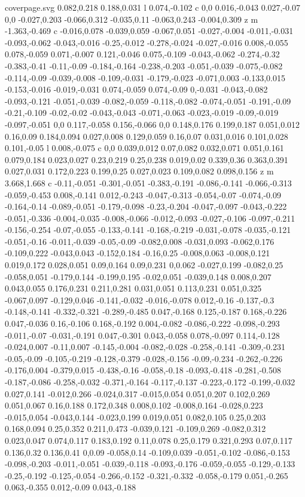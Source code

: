 \begin{filecontents}[noheader]{coverpage.svg}
0.082,0.218 0.188,0.031 l 0.074,-0.102 c 0,0 0.016,-0.043 0.027,-0.07 0,0 -0.027,0.203 -0.066,0.312 -0.035,0.11 -0.063,0.243 -0.004,0.309 z m -1.363,-0.469 c -0.016,0.078 -0.039,0.059 -0.067,0.051 -0.027,-0.004 -0.011,-0.031 -0.093,-0.062 -0.043,-0.016 -0.25,-0.012 -0.278,-0.024 -0.027,-0.016 0.008,-0.055 0.078,-0.059 0.071,-0.007 0.121,-0.046 0.075,-0.109 -0.043,-0.062 -0.274,-0.32 -0.383,-0.41 -0.11,-0.09 -0.184,-0.164 -0.238,-0.203 -0.051,-0.039 -0.075,-0.082 -0.114,-0.09 -0.039,-0.008 -0.109,-0.031 -0.179,-0.023 -0.071,0.003 -0.133,0.015 -0.153,-0.016 -0.019,-0.031 0.074,-0.059 0.074,-0.09 0,-0.031 -0.043,-0.082 -0.093,-0.121 -0.051,-0.039 -0.082,-0.059 -0.118,-0.082 -0.074,-0.051 -0.191,-0.09 -0.21,-0.109 -0.02,-0.02 -0.043,-0.043 -0.071,-0.063 -0.023,-0.019 -0.09,-0.019 -0.097,-0.051 0,0 0.117,-0.058 0.156,-0.066 0,0 0.148,0.176 0.199,0.187 0.051,0.012 0.16,0.09 0.184,0.094 0.027,0.008 0.129,0.059 0.16,0.07 0.031,0.016 0.101,0.028 0.101,-0.05 l 0.008,-0.075 c 0,0 0.039,0.012 0.07,0.082 0.032,0.071 0.051,0.161 0.079,0.184 0.023,0.027 0.23,0.219 0.25,0.238 0.019,0.02 0.339,0.36 0.363,0.391 0.027,0.031 0.172,0.223 0.199,0.25 0.027,0.023 0.109,0.082 0.098,0.156 z m 3.668,1.668 c -0.11,-0.051 -0.301,-0.051 -0.383,-0.191 -0.086,-0.141 -0.066,-0.313 -0.059,-0.453 0.008,-0.141 0.012,-0.243 -0.047,-0.313 -0.054,-0.07 -0.074,-0.09 -0.164,-0.14 -0.089,-0.051 -0.179,-0.098 -0.23,-0.204 -0.047,-0.097 -0.043,-0.222 -0.051,-0.336 -0.004,-0.035 -0.008,-0.066 -0.012,-0.093 -0.027,-0.106 -0.097,-0.211 -0.156,-0.254 -0.07,-0.055 -0.133,-0.141 -0.168,-0.219 -0.031,-0.078 -0.035,-0.121 -0.051,-0.16 -0.011,-0.039 -0.05,-0.09 -0.082,0.008 -0.031,0.093 -0.062,0.176 -0.109,0.222 -0.043,0.043 -0.152,0.184 -0.16,0.25 -0.008,0.063 -0.008,0.121 0.019,0.172 0.028,0.051 0.09,0.164 0.09,0.231 0,0.062 -0.027,0.199 -0.082,0.25 -0.058,0.051 -0.179,0.144 -0.199,0.195 -0.02,0.051 -0.039,0.148 0.008,0.207 0.043,0.055 0.176,0.231 0.211,0.281 0.031,0.051 0.113,0.231 0.051,0.325 -0.067,0.097 -0.129,0.046 -0.141,-0.032 -0.016,-0.078 0.012,-0.16 -0.137,-0.3 -0.148,-0.141 -0.332,-0.321 -0.289,-0.485 0.047,-0.168 0.125,-0.187 0.168,-0.226 0.047,-0.036 0.16,-0.106 0.168,-0.192 0.004,-0.082 -0.086,-0.222 -0.098,-0.293 -0.011,-0.07 -0.031,-0.191 0.047,-0.301 0.043,-0.058 0.078,-0.097 0.114,-0.128 -0.024,0.007 -0.11,0.007 -0.145,-0.004 -0.082,-0.028 -0.258,-0.141 -0.309,-0.231 -0.05,-0.09 -0.105,-0.219 -0.128,-0.379 -0.028,-0.156 -0.09,-0.234 -0.262,-0.226 -0.176,0.004 -0.379,0.015 -0.438,-0.16 -0.058,-0.18 -0.093,-0.418 -0.281,-0.508 -0.187,-0.086 -0.258,-0.032 -0.371,-0.164 -0.117,-0.137 -0.223,-0.172 -0.199,-0.032 0.027,0.141 -0.012,0.266 -0.024,0.317 -0.015,0.054 0.051,0.207 0.102,0.269 0.051,0.067 0.16,0.188 0.172,0.348 0.008,0.102 -0.008,0.164 -0.028,0.223 -0.015,0.054 -0.043,0.144 -0.023,0.199 0.019,0.051 0.082,0.105 0.25,0.203 0.168,0.094 0.25,0.352 0.211,0.473 -0.039,0.121 -0.109,0.269 -0.082,0.312 0.023,0.047 0.074,0.117 0.183,0.192 0.11,0.078 0.25,0.179 0.321,0.293 0.07,0.117 0.136,0.32 0.136,0.41 0,0.09 -0.058,0.14 -0.109,0.039 -0.051,-0.102 -0.086,-0.153 -0.098,-0.203 -0.011,-0.051 -0.039,-0.118 -0.093,-0.176 -0.059,-0.055 -0.129,-0.133 -0.25,-0.192 -0.125,-0.054 -0.266,-0.152 -0.321,-0.332 -0.058,-0.179 0.051,-0.265 0.063,-0.355 0.012,-0.09 0.043,-0.188 
\end{filecontents}
